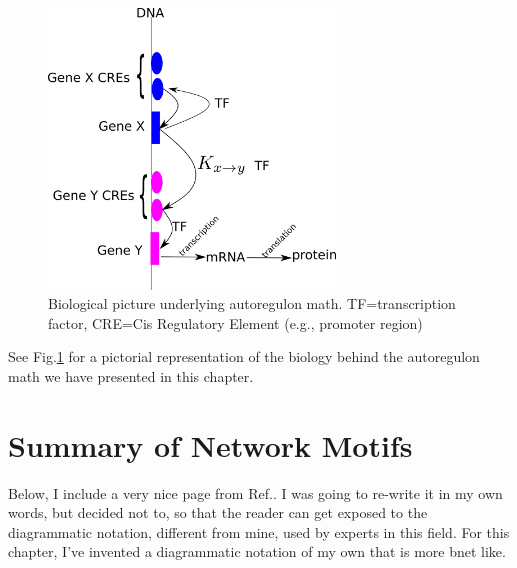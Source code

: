 \begin{figure}[h!]
\centering
\includegraphics[width=3in]
{autoregulons/autoreg-bio.png}
\caption{Biological picture underlying
autoregulon math.  TF=transcription factor,
CRE=Cis Regulatory Element (e.g., promoter region)}
\label{fig-autoreg-bio}
\end{figure}

See Fig.\ref{fig-autoreg-bio} for a 
pictorial representation
of the biology behind the autoregulon
math we have presented in this chapter.

\section{Summary of Network Motifs}
Below, I include a very nice page from Ref.\cite{alon-book}.
I was going to re-write it in my own words, but
decided not to, so that the reader can get exposed to
the diagrammatic  notation, different from mine, used by experts in this field.
For this chapter, I've invented a diagrammatic
notation of my own that is more bnet like.
\newpage

